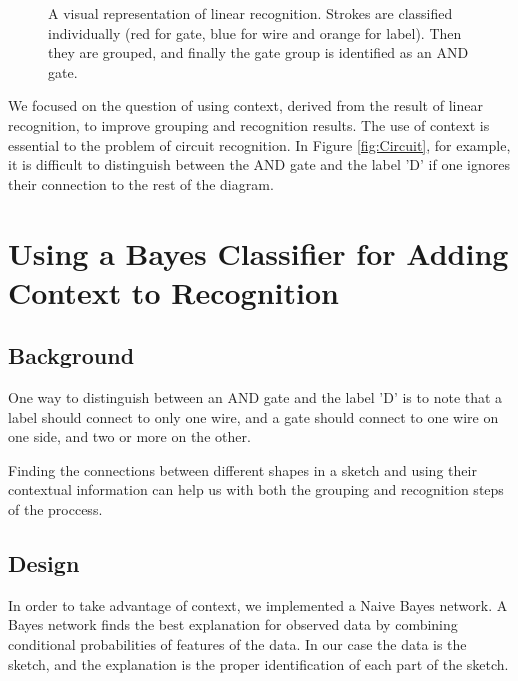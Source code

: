 \documentclass{article}
\begin{document}
\begin{figure}[h!]
\centering
{}
\caption{A visual representation of linear recognition. Strokes are classified individually (red for gate, blue for wire and orange for label). Then they are grouped, and finally the gate group is identified as an AND gate.}
\label{fig:Sequence}
\end{figure}

We focused on the question of using context, derived from the result of linear recognition, to improve grouping and recognition results. The use of context is essential to the problem of circuit recognition. In Figure \ref{fig:Circuit}, for example, it is difficult to distinguish between the AND gate and the label 'D' if one ignores their connection to the rest of the diagram.
\section{Using a Bayes Classifier for Adding Context to Recognition}
\subsection{Background}
One way to distinguish between an AND gate and the label 'D' is to note that a label should connect to only one wire, and a gate should connect to one wire on one side, and two or more on the other.

Finding the connections between different shapes in a sketch and using their contextual information can help us with both the grouping and recognition steps of the proccess.
\subsection{Design}
In order to take advantage of context, we implemented a Naive Bayes network. A Bayes network finds the best explanation for observed data by combining conditional probabilities of features of the data. In our case the data is the sketch, and the explanation is the proper identification of each part of the sketch.
\end{document}
